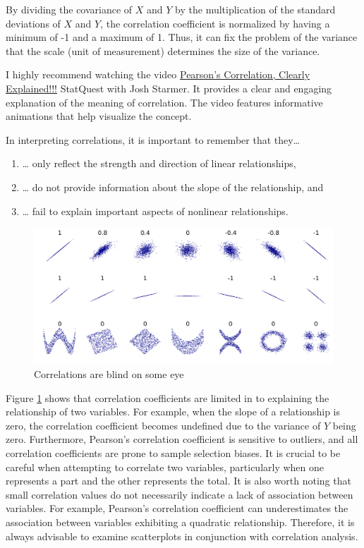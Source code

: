 \documentclass[
  12pt,
  oneside]{book}
\providecommand{\tightlist}{%
  \setlength{\itemsep}{0pt}\setlength{\parskip}{0pt}}
\theoremstyle{definition}
\theoremstyle{definition}
\theoremstyle{definition}
\theoremstyle{definition}
\theoremstyle{remark}
\begin{document}
By dividing the covariance of \(X\) and \(Y\) by the multiplication of the standard deviations of \(X\) and \(Y\), the correlation coefficient is normalized by having a minimum of -1 and a maximum of 1. Thus, it can fix the problem of the variance that the scale (unit of measurement) determines the size of the variance.

I highly recommend watching the video \href{https://youtu.be/xZ_z8KWkhXE}{Pearson's Correlation, Clearly Explained!!!}
StatQuest with Josh Starmer. It provides a clear and engaging explanation of the meaning of correlation. The video features informative animations that help visualize the concept.

In interpreting correlations, it is important to remember that they\ldots{}

\begin{enumerate}
\def\labelenumi{\arabic{enumi}.}
\tightlist
\item
  \ldots{} only reflect the strength and direction of linear relationships,
\item
  \ldots{} do not provide information about the slope of the relationship, and
\item
  \ldots{} fail to explain important aspects of nonlinear relationships.
\end{enumerate}

\begin{figure}

{\centering \includegraphics[width=0.75\linewidth]{fig/corelate_overview} 

}

\caption{Correlations are blind on some eye}\label{fig:corelateoverview}
\end{figure}

Figure \ref{fig:corelateoverview} shows that correlation coefficients are limited in to explaining the relationship of two variables.
For example, when the slope of a relationship is zero, the correlation coefficient becomes undefined due to the variance of \(Y\) being zero.
Furthermore, Pearson's correlation coefficient is sensitive to outliers, and all correlation coefficients are prone to sample selection biases. It is crucial to be careful when attempting to correlate two variables, particularly when one represents a part and the other represents the total.
It is also worth noting that small correlation values do not necessarily indicate a lack of association between variables. For example, Pearson's correlation coefficient can underestimates the association between variables exhibiting a quadratic relationship. Therefore, it is always advisable to examine scatterplots in conjunction with correlation analysis.
\end{document}
